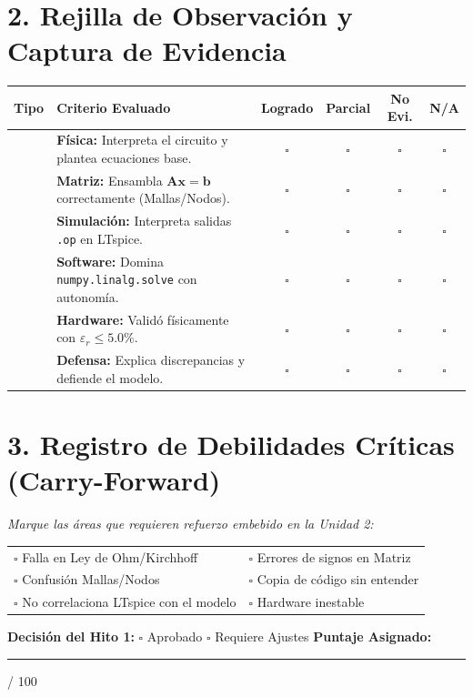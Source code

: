 \documentclass[11pt, a4paper]{article}
\begin{document}
\section*{2. Rejilla de Observación y Captura de Evidencia}
\renewcommand{\arraystretch}{1.5}
\noindent
\begin{tabularx}{\textwidth}{|c|X|c|c|c|c|}
    \hline
    \rowcolor{ucbblue!10}
    \textbf{Tipo} & \textbf{Criterio Evaluado} & \textbf{Logrado} & \textbf{Parcial} & \textbf{No Evi.} & \textbf{N/A} \\
    \hline
    [S] & \textbf{Física:} Interpreta el circuito y plantea ecuaciones base. & $\square$ & $\square$ & $\square$ & $\square$ \\
    \hline
    [S] & \textbf{Matriz:} Ensambla $\mathbf{A}\mathbf{x}=\mathbf{b}$ correctamente (Mallas/Nodos). & $\square$ & $\square$ & $\square$ & $\square$ \\
    \hline
    [S] & \textbf{Simulación:} Interpreta salidas \texttt{.op} en LTspice. & $\square$ & $\square$ & $\square$ & $\square$ \\
    \hline
    [D] & \textbf{Software:} Domina \texttt{numpy.linalg.solve} con autonomía. & $\square$ & $\square$ & $\square$ & $\square$ \\
    \hline
    [D] & \textbf{Hardware:} Validó físicamente con $\varepsilon_r \le 5.0\%$. & $\square$ & $\square$ & $\square$ & $\square$ \\
    \hline
    [S] & \textbf{Defensa:} Explica discrepancias y defiende el modelo. & $\square$ & $\square$ & $\square$ & $\square$ \\
    \hline
\end{tabularx}

\section*{3. Registro de Debilidades Críticas (Carry-Forward)}
\textit{Marque las áreas que requieren refuerzo embebido en la Unidad 2:}

\vspace{0.3cm}
\noindent
\renewcommand{\arraystretch}{1.3}
\begin{tabular}{@{}ll@{}}
    $\square$ Falla en Ley de Ohm/Kirchhoff & $\square$ Errores de signos en Matriz \\
    $\square$ Confusión Mallas/Nodos & $\square$ Copia de código sin entender \\
    $\square$ No correlaciona LTspice con el modelo & $\square$ Hardware inestable
\end{tabular}

\vspace{0.6cm}
\noindent\textbf{Decisión del Hito 1:} $\square$ Aprobado \quad $\square$ Requiere Ajustes \quad \textbf{Puntaje Asignado:} \rule{2cm}{0.4pt} / 100
\end{document}
